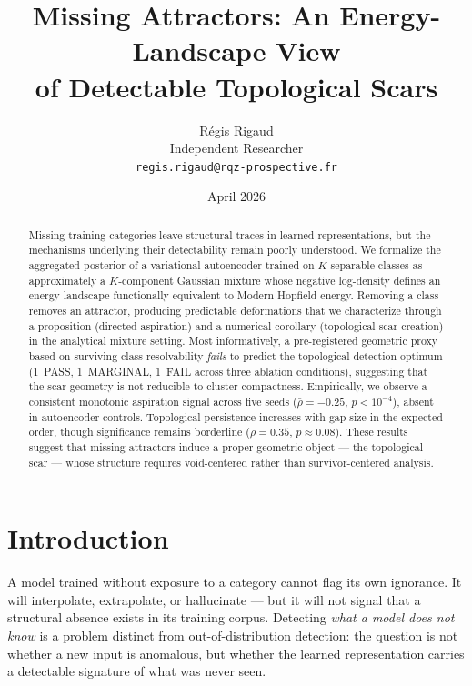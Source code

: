 \documentclass[11pt]{article}
\title{Missing Attractors: An Energy-Landscape View\\of Detectable Topological Scars}
\author{R\'egis Rigaud \\ Independent Researcher \\ \texttt{regis.rigaud@rqz-prospective.fr}}
\date{April 2026}
\begin{document}
\maketitle

\begin{abstract}
Missing training categories leave structural traces in learned representations,
but the mechanisms underlying their detectability remain poorly understood.
We formalize the aggregated posterior of a variational autoencoder trained on
$K$ separable classes as approximately a $K$-component Gaussian mixture whose
negative log-density defines an energy landscape functionally equivalent to
Modern Hopfield energy.
Removing a class removes an attractor, producing predictable deformations that
we characterize through a proposition (directed aspiration) and a numerical
corollary (topological scar creation) in the analytical mixture setting.
Most informatively, a pre-registered geometric proxy based on surviving-class
resolvability \emph{fails} to predict the topological detection optimum
(1~PASS, 1~MARGINAL, 1~FAIL across three ablation conditions), suggesting
that the scar geometry is not reducible to cluster compactness.
Empirically, we observe a consistent monotonic aspiration signal across five
seeds ($\bar{\rho} = -0.25$, $p < 10^{-4}$), absent in autoencoder controls.
Topological persistence increases with gap size in the expected order, though
significance remains borderline ($\rho = 0.35$, $p \approx 0.08$).
These results suggest that missing attractors induce a proper geometric object
--- the topological scar --- whose structure requires void-centered rather
than survivor-centered analysis.
\end{abstract}


\section{Introduction}
\label{sec:intro}

A model trained without exposure to a category cannot flag its own ignorance.
It will interpolate, extrapolate, or hallucinate --- but it will not signal
that a structural absence exists in its training corpus.
Detecting \emph{what a model does not know} is a problem distinct from
out-of-distribution detection: the question is not whether a new input is
anomalous, but whether the learned representation carries a detectable
signature of what was never seen.
\end{document}
